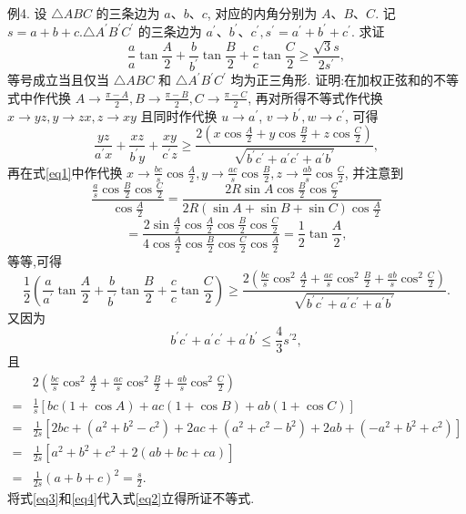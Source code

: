 例4. 设 $\triangle A B C$ 的三条边为 $a 、 b 、 c$, 对应的内角分别为 $A 、 B 、 C$. 记 $s= a+b+c . \triangle A^{\prime} B^{\prime} C^{\prime}$ 的三条边为 $a^{\prime} 、 b^{\prime} 、 c^{\prime}, s^{\prime}=a^{\prime}+b^{\prime}+c^{\prime}$. 求证
$$
\frac{a}{a} \tan \frac{A}{2}+\frac{b}{b^{\prime}} \tan \frac{B}{2}+\frac{c}{c} \tan \frac{C}{2} \geqslant \frac{\sqrt{3} s}{2 s^{\prime}},
$$
等号成立当且仅当 $\triangle A B C$ 和 $\triangle A^{\prime} B^{\prime} C^{\prime}$ 均为正三角形.
证明:在加权正弦和的不等式中作代换 $A \rightarrow \frac{\pi-A}{2}, B \rightarrow \frac{\pi-B}{2}, C \rightarrow \frac{\pi-C}{2}$, 再对所得不等式作代换 $x \rightarrow y z, y \rightarrow z x, z \rightarrow x y$ 且同时作代换 $u \rightarrow a^{\prime}$, $v \rightarrow b^{\prime}, w \rightarrow c^{\prime}$, 可得
$$
\frac{y z}{a^{\prime} x}+\frac{x z}{b^{\prime} y}+\frac{x y}{c^{\prime} z} \geqslant \frac{2\left(x \cos \frac{A}{2}+y \cos \frac{B}{2}+z \cos \frac{C}{2}\right)}{\sqrt{b^{\prime} c^{\prime}+a^{\prime} c^{\prime}+a^{\prime} b^{\prime}}}, \label{eq1}
$$
再在式\ref{eq1}中作代换 $x \rightarrow \frac{b c}{s} \cos \frac{A}{2}, y \rightarrow \frac{a c}{s} \cos \frac{B}{2}, z \rightarrow \frac{a b}{s} \cos \frac{C}{2}$, 并注意到
$$
\frac{\frac{a}{s} \cos \frac{B}{2} \cos \frac{C}{2}}{\cos \frac{A}{2}}=\frac{2 R \sin A \cos \frac{B}{2} \cos \frac{C}{2}}{2 R(\sin A+\sin B+\sin C) \cos \frac{A}{2}}
$$
$$
=\frac{2 \sin \frac{A}{2} \cos \frac{A}{2} \cos \frac{B}{2} \cos \frac{C}{2}}{4 \cos \frac{A}{2} \cos \frac{B}{2} \cos \frac{C}{2} \cos \frac{A}{2}}=\frac{1}{2} \tan \frac{A}{2},
$$
等等,可得
$$
\frac{1}{2}\left(\frac{a}{a^{\prime}} \tan \frac{A}{2}+\frac{b}{b^{\prime}} \tan \frac{B}{2}+\frac{c}{c} \tan \frac{C}{2}\right) \geqslant \frac{2\left(\frac{b c}{s} \cos ^2 \frac{A}{2}+\frac{a c}{s} \cos ^2 \frac{B}{2}+\frac{a b}{s} \cos ^2 \frac{C}{2}\right)}{\sqrt{b^{\prime} c^{\prime}+a^{\prime} c^{\prime}+a^{\prime} b^{\prime}}} . \label{eq2}
$$
又因为
$$
b^{\prime} c^{\prime}+a^{\prime} c^{\prime}+a^{\prime} b^{\prime} \leqslant \frac{4}{3} s^{\prime 2}, \label{eq3}
$$
且
$$
\begin{aligned}
& 2\left(\frac{b c}{s} \cos ^2 \frac{A}{2}+\frac{a c}{s} \cos ^2 \frac{B}{2}+\frac{a b}{s} \cos ^2 \frac{C}{2}\right) \\
= & \frac{1}{s}[b c(1+\cos A)+a c(1+\cos B)+a b(1+\cos C)] \\
= & \frac{1}{2 s}\left[2 b c+\left(a^2+b^2-c^2\right)+2 a c+\left(a^2+c^2-b^2\right)+2 a b+\left(-a^2+b^2+c^2\right)\right] \\
= & \frac{1}{2 s}\left[a^2+b^2+c^2+2(a b+b c+c a)\right] \\
= & \frac{1}{2 s}(a+b+c)^2=\frac{s}{2} .
\end{aligned} \label{eq4}
$$
将式\ref{eq3}和\ref{eq4}代入式\ref{eq2}立得所证不等式.



